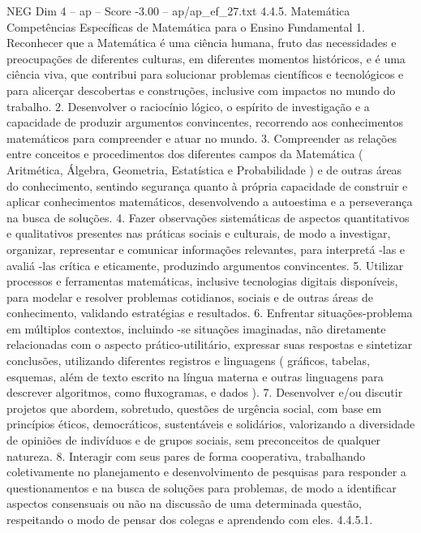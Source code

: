 \begin{textsample}{NEG Dim 4 – ap – Score -3.00 – ap/ap\_ef\_27.txt}  \label{ex:f4_neg_054}
4.4.5.
Matemática Competências Específicas de Matemática para o Ensino Fundamental 1.
Reconhecer que a Matemática é uma ciência humana, fruto das necessidades e preocupações de diferentes culturas, em diferentes momentos históricos, e é uma ciência viva, que contribui para solucionar problemas científicos e tecnológicos e para alicerçar descobertas e construções, inclusive com impactos no mundo do trabalho. 2.
Desenvolver o raciocínio lógico, o espírito de investigação e a capacidade de produzir argumentos convincentes, recorrendo aos conhecimentos matemáticos para compreender e atuar no mundo. 3.
Compreender as relações entre conceitos e procedimentos dos diferentes campos da Matemática ( Aritmética, Álgebra, Geometria, Estatística e Probabilidade ) e de outras áreas do conhecimento, sentindo segurança quanto à própria capacidade de construir e aplicar conhecimentos matemáticos, desenvolvendo a autoestima e a perseverança na busca de soluções. 4.
Fazer observações sistemáticas de aspectos quantitativos e qualitativos presentes nas práticas sociais e culturais, de modo a investigar, organizar, representar e comunicar informações relevantes, para interpretá -las e avaliá -las crítica e eticamente, produzindo argumentos convincentes. 5.
Utilizar processos e ferramentas matemáticas, inclusive tecnologias digitais disponíveis, para modelar e resolver problemas cotidianos, sociais e de outras áreas de conhecimento, validando estratégias e resultados. 6.
Enfrentar situações-problema em múltiplos contextos, incluindo -se situações imaginadas, não diretamente relacionadas com o aspecto prático-utilitário, expressar suas respostas e sintetizar conclusões, utilizando diferentes registros e linguagens ( gráficos, tabelas, esquemas, além de texto escrito na língua materna e outras linguagens para descrever algoritmos, como fluxogramas, e dados ). 7.
Desenvolver e/ou discutir projetos que abordem, sobretudo, questões de urgência social, com base em princípios éticos, democráticos, sustentáveis e solidários, valorizando a diversidade de opiniões de indivíduos e de grupos sociais, sem preconceitos de qualquer natureza. 8.
Interagir com seus pares de forma cooperativa, trabalhando coletivamente no planejamento e desenvolvimento de pesquisas para responder a questionamentos e na busca de soluções para problemas, de modo a identificar aspectos consensuais ou não na discussão de uma determinada questão, respeitando o modo de pensar dos colegas e aprendendo com eles. 4.4.5.1.

\end{textsample}
